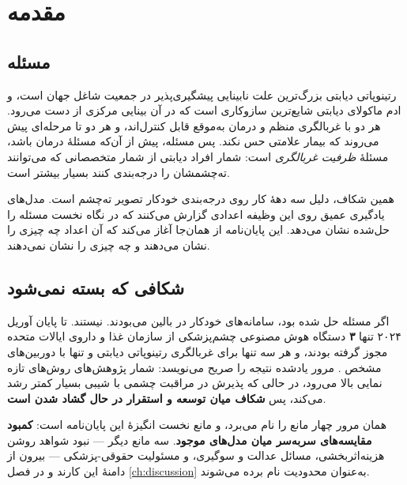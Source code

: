
\chapter{مقدمه}
\label{ch:intro}

\section{مسئله}

رتینوپاتی دیابتی بزرگ‌ترین علت نابینایی پیشگیری‌پذیر در جمعیت شاغل جهان است، و ادم ماکولای
دیابتی شایع‌ترین سازوکاری است که در آن بینایی مرکزی از دست می‌رود. هر دو با غربالگری منظم و
درمان به‌موقع قابل کنترل‌اند، و هر دو تا مرحله‌ای پیش می‌روند که بیمار علامتی حس نکند. پس
مسئله، پیش از آن‌که مسئلهٔ درمان باشد، مسئلهٔ \emph{ظرفیت غربالگری} است: شمار افراد دیابتی از
شمار متخصصانی که می‌توانند ته‌چشمشان را درجه‌بندی کنند بسیار بیشتر است.

همین شکاف، دلیل سه دههٔ کار روی درجه‌بندی خودکار تصویر ته‌چشم است. مدل‌های یادگیری عمیق روی
این وظیفه اعدادی گزارش می‌کنند که در نگاه نخست مسئله را حل‌شده نشان می‌دهد. این پایان‌نامه از
همان‌جا آغاز می‌کند که آن اعداد چه چیزی را نشان می‌دهند و چه چیزی را نشان نمی‌دهند.

\section{شکافی که بسته نمی‌شود}

اگر مسئله حل شده بود، سامانه‌های خودکار در بالین می‌بودند. نیستند. تا پایان آوریل \num{۲۰۲۴} تنها
\textbf{\num{۳}} دستگاه هوش مصنوعی چشم‌پزشکی از سازمان غذا و داروی ایالات متحده مجوز گرفته
بودند، و هر سه تنها برای غربالگری رتینوپاتی دیابتی و تنها با دوربین‌های مشخص
\cite{ruamviboonsuk2024review}. مرور یادشده نتیجه را صریح می‌نویسد: شمار پژوهش‌های روش‌های
تازه نمایی بالا می‌رود، در حالی که پذیرش در مراقبت چشمی با شیبی بسیار کمتر رشد می‌کند، پس
\textbf{شکاف میان توسعه و استقرار در حال گشاد شدن است}.

همان مرور چهار مانع را نام می‌برد، و مانع نخست انگیزهٔ این پایان‌نامه است: \textbf{کمبود
مقایسه‌های سربه‌سر میان مدل‌های موجود}. سه مانع دیگر — نبود شواهد روشن هزینه‌اثربخشی، مسائل
عدالت و سوگیری، و مسئولیت حقوقی-پزشکی — بیرون از دامنهٔ این کارند و در فصل \ref{ch:discussion}
به‌عنوان محدودیت نام برده می‌شوند.

